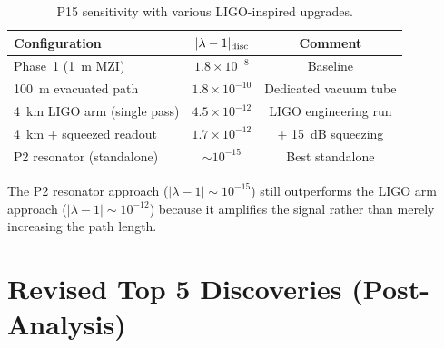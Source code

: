 \documentclass[11pt]{article}
\newcommand{\ee}[1]{\times 10^{#1}}
\newcommand{\lam}{\lambda}
\begin{document}
\begin{table}[H]
\centering
\caption{P15 sensitivity with various LIGO-inspired upgrades.}
\begin{tabular}{lcc}
\toprule
Configuration & $|\lam-1|_{\rm disc}$ & Comment \\
\midrule
Phase~1 (1~m MZI) & $1.8\ee{-8}$ & Baseline \\
100~m evacuated path & $1.8\ee{-10}$ & Dedicated vacuum tube \\
4~km LIGO arm (single pass) & $4.5\ee{-12}$ & LIGO engineering run \\
4~km + squeezed readout & $1.7\ee{-12}$ & + 15~dB squeezing \\
P2 resonator (standalone) & $\sim 10^{-15}$ & Best standalone \\
\bottomrule
\end{tabular}
\end{table}

The P2 resonator approach ($|\lam-1| \sim 10^{-15}$) still
outperforms the LIGO arm approach ($|\lam-1| \sim 10^{-12}$)
because it amplifies the signal rather than merely increasing
the path length.

\section*{Revised Top 5 Discoveries (Post-Analysis)}
\label{sec:top5-final}
\end{document}
